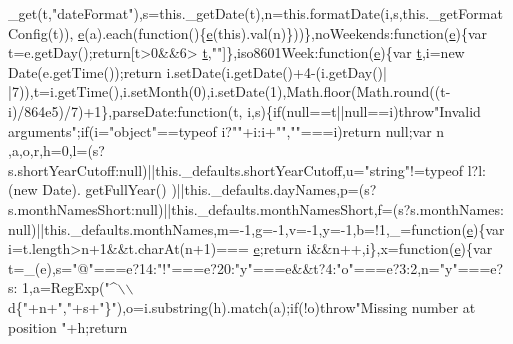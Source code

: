 \begin{DoxyCode}
      \_get(t,\textcolor{stringliteral}{"dateFormat"}),s=this.\_getDate(t),n=this.formatDate(i,s,this.\_getFormatConfig(t)),
      \hyperlink{jquery-ui_8min_8js_a2c038346d47955cbe2cb91e338edd7e1}{e}(a).each(\textcolor{keyword}{function}()\{\hyperlink{jquery-ui_8min_8js_a2c038346d47955cbe2cb91e338edd7e1}{e}(\textcolor{keyword}{this}).val(n)\}))\},noWeekends:\textcolor{keyword}{function}(\hyperlink{jquery-ui_8min_8js_a2c038346d47955cbe2cb91e338edd7e1}{e})\{var t=e.getDay();\textcolor{keywordflow}{return}[t>0&&6>
      \hyperlink{jquery-2_80_83_8min_8js_aaccc9105df5383111407fd5b41255e23}{t},\textcolor{stringliteral}{""}]\},iso8601Week:\textcolor{keyword}{function}(\hyperlink{jquery-ui_8min_8js_a2c038346d47955cbe2cb91e338edd7e1}{e})\{var \hyperlink{jquery-2_80_83_8min_8js_aaccc9105df5383111407fd5b41255e23}{t},i=\textcolor{keyword}{new} Date(e.getTime());\textcolor{keywordflow}{return} i.setDate(i.getDate()+4-(i.getDay()|
      |7)),t=i.getTime(),i.setMonth(0),i.setDate(1),Math.floor(Math.round((t-i)/864e5)/7)+1\},parseDate:\textcolor{keyword}{function}(t,
      i,s)\{\textcolor{keywordflow}{if}(null==t||null==i)\textcolor{keywordflow}{throw}\textcolor{stringliteral}{"Invalid arguments"};\textcolor{keywordflow}{if}(i=\textcolor{stringliteral}{"object"}==typeof i?\textcolor{stringliteral}{""}+i:i+\textcolor{stringliteral}{""},\textcolor{stringliteral}{""}===i)\textcolor{keywordflow}{return} null;var n
      ,a,o,r,h=0,l=(s?s.shortYearCutoff:null)||this.\_defaults.shortYearCutoff,u=\textcolor{stringliteral}{"string"}!=typeof l?l:(\textcolor{keyword}{new} Date).
      getFullYear()%
      )||this.\_defaults.dayNames,p=(s?s.monthNamesShort:null)||this.\_defaults.monthNamesShort,f=(s?s.monthNames:
      null)||this.\_defaults.monthNames,m=-1,g=-1,v=-1,y=-1,b=!1,\_=\textcolor{keyword}{function}(\hyperlink{jquery-ui_8min_8js_a2c038346d47955cbe2cb91e338edd7e1}{e})\{var i=t.length>n+1&&t.charAt(n+1)===
      \hyperlink{jquery-ui_8min_8js_a2c038346d47955cbe2cb91e338edd7e1}{e};\textcolor{keywordflow}{return} i&&n++,i\},x=\textcolor{keyword}{function}(\hyperlink{jquery-ui_8min_8js_a2c038346d47955cbe2cb91e338edd7e1}{e})\{var t=\_(e),s=\textcolor{stringliteral}{"@"}===e?14:\textcolor{stringliteral}{"!"}===e?20:\textcolor{stringliteral}{"y"}===e&&t?4:\textcolor{stringliteral}{"o"}===e?3:2,n=\textcolor{stringliteral}{"y"}===e?s:
      1,a=RegExp(\textcolor{stringliteral}{"^\(\backslash\)\(\backslash\)d\{"}+n+\textcolor{stringliteral}{","}+s+\textcolor{stringliteral}{"\}"}),o=i.substring(h).match(a);\textcolor{keywordflow}{if}(!o)\textcolor{keywordflow}{throw}\textcolor{stringliteral}{"Missing number at position "}+h;\textcolor{keywordflow}{return} 

\end{DoxyCode}
